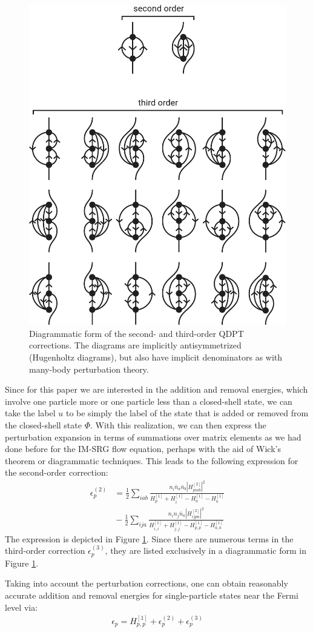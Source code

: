 \begin{figure}
\includegraphics[width=.48\linewidth]{fig-diagrams-sfe}
\caption{Diagrammatic form of the second- and third-order QDPT corrections.  The diagrams are implicitly antisymmetrized (Hugenholtz diagrams), but also have implicit denominators as with many-body perturbation theory.}
\label{fig:diagrams-sfe}
\end{figure}

Since for this paper we are interested in the addition and removal energies, which involve one particle more or one particle less than a closed-shell state, we can take the label $u$ to be simply the label of the state that is added or removed from the closed-shell state $\Phi$.  With this realization, we can then express the perturbation expansion in terms of summations over matrix elements as we had done before for the IM-SRG flow equation, perhaps with the aid of Wick's theorem or diagrammatic techniques.  This leads to the following expression for the second-order correction:
\begin{align*}
  \epsilon_p^{(2)}
  &=
  \frac{1}{2} \sum_{i a b} \frac{n_i \bar{n}_a \bar{n}_b |H^{[2]}_{p i a b}|^2}{H^{[1]}_p + H^{[1]}_i - H^{[1]}_a - H^{[1]}_b} \\
  &{}-
  \frac{1}{2} \sum_{i j a} \frac{n_i n_j \bar{n}_a |H^{[2]}_{i j p a}|^2}{H^{[1]}_{i, i} + H^{[1]}_{j, j} - H^{[1]}_{p, p} - H^{[1]}_{a, a}}
\end{align*}
The expression is depicted in Figure \ref{fig:diagrams-sfe}.  Since there are numerous terms in the third-order correction $\epsilon_p^{(3)}$, they are listed exclusively in a diagrammatic form in Figure \ref{fig:diagrams-sfe}.

Taking into account the perturbation corrections, one can obtain reasonably accurate addition and removal energies for single-particle states near the Fermi level via:
\begin{align*}
  \epsilon_p = H^{[1]}_{p, p} + \epsilon_p^{(2)} + \epsilon_p^{(3)}
\end{align*}

